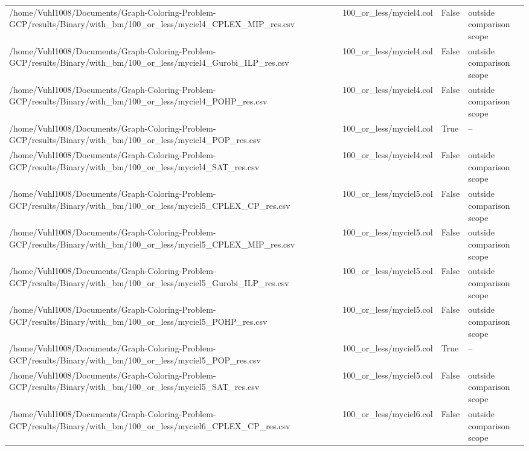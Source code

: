 \begin{table}[htbp]
\begin{tabular}{llll}
/home/Vuhl1008/Documents/Graph-Coloring-Problem-GCP/results/Binary/with\_bm/100\_or\_less/myciel4\_CPLEX\_MIP\_res.csv & 100\_or\_less/myciel4.col & False & outside comparison scope \\
/home/Vuhl1008/Documents/Graph-Coloring-Problem-GCP/results/Binary/with\_bm/100\_or\_less/myciel4\_Gurobi\_ILP\_res.csv & 100\_or\_less/myciel4.col & False & outside comparison scope \\
/home/Vuhl1008/Documents/Graph-Coloring-Problem-GCP/results/Binary/with\_bm/100\_or\_less/myciel4\_POHP\_res.csv & 100\_or\_less/myciel4.col & False & outside comparison scope \\
/home/Vuhl1008/Documents/Graph-Coloring-Problem-GCP/results/Binary/with\_bm/100\_or\_less/myciel4\_POP\_res.csv & 100\_or\_less/myciel4.col & True & -- \\
/home/Vuhl1008/Documents/Graph-Coloring-Problem-GCP/results/Binary/with\_bm/100\_or\_less/myciel4\_SAT\_res.csv & 100\_or\_less/myciel4.col & False & outside comparison scope \\
/home/Vuhl1008/Documents/Graph-Coloring-Problem-GCP/results/Binary/with\_bm/100\_or\_less/myciel5\_CPLEX\_CP\_res.csv & 100\_or\_less/myciel5.col & False & outside comparison scope \\
/home/Vuhl1008/Documents/Graph-Coloring-Problem-GCP/results/Binary/with\_bm/100\_or\_less/myciel5\_CPLEX\_MIP\_res.csv & 100\_or\_less/myciel5.col & False & outside comparison scope \\
/home/Vuhl1008/Documents/Graph-Coloring-Problem-GCP/results/Binary/with\_bm/100\_or\_less/myciel5\_Gurobi\_ILP\_res.csv & 100\_or\_less/myciel5.col & False & outside comparison scope \\
/home/Vuhl1008/Documents/Graph-Coloring-Problem-GCP/results/Binary/with\_bm/100\_or\_less/myciel5\_POHP\_res.csv & 100\_or\_less/myciel5.col & False & outside comparison scope \\
/home/Vuhl1008/Documents/Graph-Coloring-Problem-GCP/results/Binary/with\_bm/100\_or\_less/myciel5\_POP\_res.csv & 100\_or\_less/myciel5.col & True & -- \\
/home/Vuhl1008/Documents/Graph-Coloring-Problem-GCP/results/Binary/with\_bm/100\_or\_less/myciel5\_SAT\_res.csv & 100\_or\_less/myciel5.col & False & outside comparison scope \\
/home/Vuhl1008/Documents/Graph-Coloring-Problem-GCP/results/Binary/with\_bm/100\_or\_less/myciel6\_CPLEX\_CP\_res.csv & 100\_or\_less/myciel6.col & False & outside comparison scope \\

\end{tabular}
\end{table}
